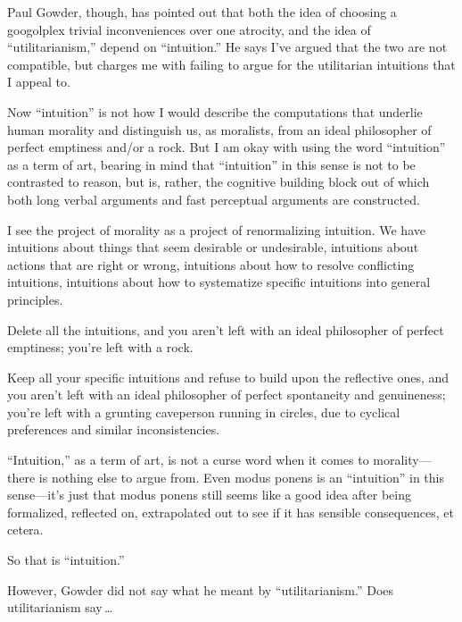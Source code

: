  Paul Gowder, though, has pointed out that both the idea of
choosing a googolplex trivial inconveniences over one atrocity, and the
idea of ``utilitarianism,'' depend
on ``intuition.'' He says
I've argued that the two are not compatible, but
charges me with failing to argue for the utilitarian intuitions that I
appeal to.


 Now ``intuition'' is not how I
would describe the computations that underlie human morality and
distinguish us, as moralists, from an ideal philosopher of perfect
emptiness and/or a rock. But I am okay with using the word
``intuition'' as a term of art,
bearing in mind that ``intuition''
in this sense is not to be contrasted to reason, but is, rather, the
cognitive building block out of which both long verbal arguments and
fast perceptual arguments are constructed.


 I see the project of morality as a project of renormalizing
intuition. We have intuitions about things that seem desirable or
undesirable, intuitions about actions that are right or wrong,
intuitions about how to resolve conflicting intuitions, intuitions
about how to systematize specific intuitions into general principles.


 Delete all the intuitions, and you aren't left
with an ideal philosopher of perfect emptiness; you're
left with a rock.


 Keep all your specific intuitions and refuse to build upon the
reflective ones, and you aren't left with an ideal
philosopher of perfect spontaneity and genuineness;
you're left with a grunting caveperson running in
circles, due to cyclical preferences and similar inconsistencies.


 ``Intuition,'' as a term of
art, is not a curse word when it comes to morality---there is nothing
else to argue from. Even modus ponens is an
``intuition'' in this
sense---it's just that modus ponens still seems like a
good idea after being formalized, reflected on, extrapolated out to see
if it has sensible consequences, et cetera.


 So that is ``intuition.''


 However, Gowder did not say what he meant by
``utilitarianism.'' Does
utilitarianism say\,\ldots

